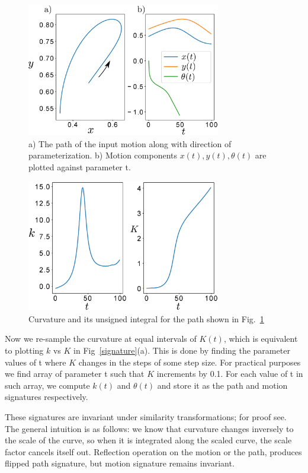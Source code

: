 \documentclass[twocolumn,10pt]{asme2e}
\begin{document}
\begin{figure}
\centering
\includegraphics[width=240pt]{figure/fig_bspline.eps}
  \caption{a) The path of the input motion along with direction of parameterization. b) Motion components $x(t), y(t), \theta(t)$ are plotted against parameter t.}
\label{bsplineFitting}
\end{figure}

\begin{figure}
\centering
\includegraphics[width=240pt]{figure/fig_curvatureK.eps}
  \caption{Curvature and its unsigned integral for the path shown in Fig.~\ref{bsplineFitting}}
\label{curvatureK}
\end{figure}

Now we re-sample the curvature at equal intervals of $K(t)$, which is equivalent to plotting $k$ vs $K$ in Fig~\ref{signature}(a).
This is done by finding the parameter values of t where $K$ changes in the steps of some step size. For practical purposes we find array of parameter t such that $K$ increments by 0.1.
For each value of t in such array, we compute $k(t)$ and $\theta(t)$ and store it as the path and motion signatures respectively.

These signatures are invariant under similarity transformations; for proof see\cite{cui2009}.
The general intuition is as follows:
we know that curvature changes inversely to the scale of the curve, so when it is integrated along the scaled curve, the scale factor cancels itself out.
Reflection operation on the motion or the path, produces flipped path signature, but motion signature remains invariant.
\end{document}
